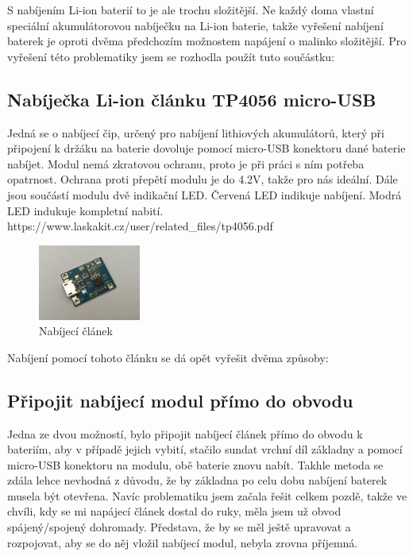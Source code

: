 S nabíjením Li-ion baterií to je ale trochu složitější. Ne každý doma vlastní speciální akumulátorovou nabíječku na Li-ion baterie, takže vyřešení nabíjení baterek je oproti dvěma předchozím možnostem napájení o malinko složitější. 
Pro vyřešení této problematiky jsem se rozhodla použít tuto součástku:


\subsection{Nabíječka Li-ion článku TP4056 micro-USB}
Jedná se o nabíjecí čip, určený pro nabíjení lithiových akumulátorů, který při připojení k držáku na baterie dovoluje pomocí micro-USB konektoru dané baterie nabíjet. Modul nemá zkratovou ochranu, proto je při práci s ním potřeba opatrnost. Ochrana proti přepětí modulu je do 4.2V, takže pro nás ideální. Dále jsou součástí modulu dvě indikační LED. Červená LED indikuje nabíjení. Modrá LED indukuje kompletní nabití. 
https://www.laskakit.cz/user/related_files/tp4056.pdf
\begin{figure}[htbp]
	\centering
	\includegraphics[width=0.3\textwidth]{img/02 ele/Napajeci clanek.jpg}
	\caption{Nabíjecí článek}
\end{figure}

Nabíjení pomocí tohoto článku se dá opět vyřešit dvěma způsoby:


\subsection{Připojit nabíjecí modul přímo do obvodu}
Jedna ze dvou možností, bylo připojit nabíjecí článek přímo do obvodu k bateriím, aby v případě jejich vybití, stačilo sundat vrchní díl základny a pomocí micro-USB konektoru na modulu, obě baterie znovu nabít.
Takhle metoda se zdála lehce nevhodná z důvodu, že by základna po celu dobu nabíjení baterek musela být otevřena. Navíc problematiku jsem začala řešit celkem pozdě, takže ve chvíli, kdy se mi napájecí článek dostal do ruky, měla jsem už obvod spájený/spojený dohromady. Představa, že by se měl ještě upravovat a rozpojovat, aby se do něj vložil nabíjecí modul, nebyla zrovna příjemná.  


